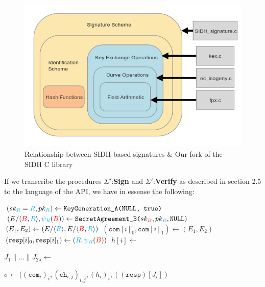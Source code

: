 \begin{figure}[htp]
\centering
\includegraphics[scale=0.7]{fullmapwcurve.png} %
\caption{Relationship between SIDH based signatures \& Our fork of the SIDH C library}
\label{fig:fullmap} %
\end{figure}

If we transcribe the procedures $\Sigma'$:\textbf{Sign} and $\Sigma'$:\textbf{Verify} as described in section 2.5 to the language of the \sidh API, we have in essense the following:\\

\begin{algorithm}
\caption{-- }\label{alg:signmath}
\begin{algorithmic}[1]
	\State $(sk_{\textcolor{cyan}{R}} = \textcolor{cyan}{R}, pk_{\textcolor{cyan}{R}}) \gets \texttt{KeyGeneration\_A(\texttt{NULL}, \texttt{true})}$
	\State $(E/\langle \textcolor{red}{B},\textcolor{cyan}{R} \rangle, \textcolor{cyan}{\psi_R}(\textcolor{red}{B})) \gets \texttt{SecretAgreement\_B(}sk_{\textcolor{red}{B}}, pk_{\textcolor{cyan}{R}}, \texttt{NULL})$
	\State $(E_{1},E_{2}) \gets (E/\langle \textcolor{cyan}{R} \rangle, E/\langle \textcolor{red}{B},\textcolor{cyan}{R} \rangle)$
	\State $(\texttt{com}[i]_{0}, \texttt{com}[i]_{1}) \gets (E_{1}, E_{2})$
	\State $(\texttt{resp}[i]_{0}, \texttt{resp}[i]_{1}) \gets (\textcolor{cyan}{R}, \textcolor{cyan}{\psi_R}(\textcolor{red}{B}))$
	\State $h[i] \gets$ 
\EndFor

\State $J_{1} \parallel ... \parallel J_{2\lambda} \gets$ 

\State \Return $\sigma \gets ((\texttt{com}_{i})_{i}, (\texttt{ch}_{i,j})_{i,j}, (h_{i})_{i}, ((\texttt{resp})[J_{i}])$
\end{algorithmic}
\end{algorithm}

